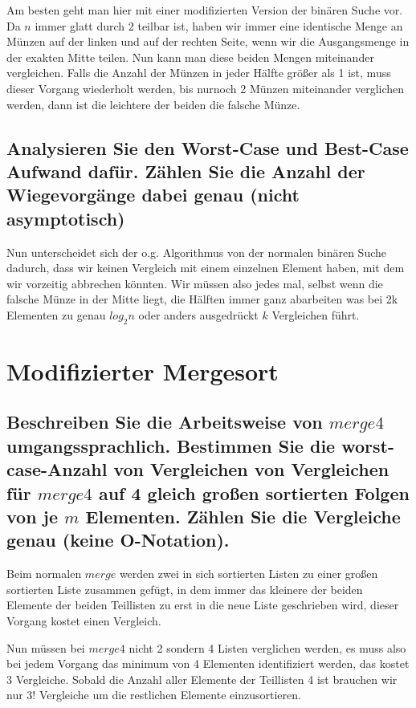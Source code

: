 \documentclass{article}
\begin{document}
Am besten geht man hier mit einer modifizierten Version der binären Suche vor.
Da $n$ immer glatt durch 2 teilbar ist, haben wir immer eine identische Menge
an Münzen auf der linken und auf der rechten Seite, wenn wir die Ausgangsmenge
in der exakten Mitte teilen. Nun kann man diese beiden Mengen miteinander
vergleichen. Falls die Anzahl der Münzen in jeder Hälfte größer als 1 ist, muss
dieser Vorgang wiederholt werden, bis nurnoch 2 Münzen miteinander verglichen
werden, dann ist die leichtere der beiden die falsche Münze.

\subsection{Analysieren Sie den Worst-Case und Best-Case Aufwand dafür. Zählen
Sie die Anzahl der Wiegevorgänge dabei genau (nicht asymptotisch)}

Nun unterscheidet sich der o.g. Algorithmus von der normalen binären Suche
dadurch, dass wir keinen Vergleich mit einem einzelnen Element haben, mit dem
wir vorzeitig abbrechen könnten. Wir müssen also jedes mal, selbst wenn die
falsche Münze in der Mitte liegt, die Hälften immer ganz abarbeiten was bei 2k
Elementen zu genau $log_2 n$ oder anders ausgedrückt $k$ Vergleichen führt.

\section{Modifizierter Mergesort}

\subsection{Beschreiben Sie die Arbeitsweise von $merge4$ umgangssprachlich.
Bestimmen Sie die worst-case-Anzahl von Vergleichen von Vergleichen für
$merge4$ auf 4 gleich großen sortierten Folgen von je $m$ Elementen. Zählen Sie
die Vergleiche genau (keine O-Notation).}

Beim normalen $merge$ werden zwei in sich sortierten Listen zu einer großen
sortierten Liste zusammen gefügt, in dem immer das kleinere der beiden Elemente
der beiden Teillisten zu erst in die neue Liste geschrieben wird, dieser
Vorgang kostet einen Vergleich.

Nun müssen bei $merge4$ nicht 2 sondern 4 Listen verglichen werden, es muss
also bei jedem Vorgang das minimum von 4 Elementen identifiziert werden, das
kostet 3 Vergleiche. Sobald die Anzahl aller Elemente der Teillisten 4 ist
brauchen wir nur $3!$ Vergleiche um die restlichen Elemente einzusortieren.
\end{document}
